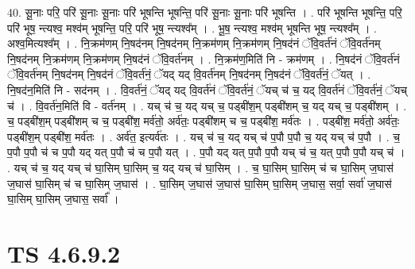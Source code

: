 \documentclass[17pt]{extarticle}
\begin{document}
40. सू॒नाः परि॒ परि॑ सू॒नाः सू॒नाः परि॑ भूषन्ति भूषन्ति॒ परि॑ सू॒नाः सू॒नाः परि॑ भूषन्ति । . परि॑ भूषन्ति भूषन्ति॒ परि॒ परि॑ भूष॒ न्त्यश्व॒ मश्व॑म् भूषन्ति॒ परि॒ परि॑ भूष॒ न्त्यश्व᳚म् । . भू॒ष॒ न्त्यश्व॒ मश्व॑म् भूषन्ति भूष॒ न्त्यश्व᳚म् । . अश्व॒मित्यश्व᳚म् । . नि॒क्रम॑णम् नि॒षद॑नम् नि॒षद॑नम् नि॒क्रम॑णम् नि॒क्रम॑णम् नि॒षद॑नं ॅवि॒वर्त॑नं ॅवि॒वर्त॑नम् नि॒षद॑नम् नि॒क्रम॑णम् नि॒क्रम॑णम् नि॒षद॑नं ॅवि॒वर्त॑नम् । . नि॒क्रम॑ण॒मिति॑ नि - क्रम॑णम् । . नि॒षद॑नं ॅवि॒वर्त॑नं ॅवि॒वर्त॑नम् नि॒षद॑नम् नि॒षद॑नं ॅवि॒वर्त॑नं॒ ॅयद् यद् वि॒वर्त॑नम् नि॒षद॑नम् नि॒षद॑नं ॅवि॒वर्त॑नं॒ ॅयत् । . नि॒षद॑न॒मिति॑ नि - सद॑नम् । . वि॒वर्त॑नं॒ ॅयद् यद् वि॒वर्त॑नं ॅवि॒वर्त॑नं॒ ॅयच् च॑ च॒ यद् वि॒वर्त॑नं ॅवि॒वर्त॑नं॒ ॅयच् च॑ । . वि॒वर्त॑न॒मिति॑ वि - वर्त॑नम् । . यच् च॑ च॒ यद् यच् च॒ पड्बी॑श॒म् पड्बी॑शम् च॒ यद् यच् च॒ पड्बी॑शम् । . च॒ पड्बी॑श॒म् पड्बी॑शम् च च॒ पड्बी॑श॒ मर्व॑तो॒ अर्व॑तः॒ पड्बी॑शम् च च॒ पड्बी॑श॒ मर्व॑तः । . पड्बी॑श॒ मर्व॑तो॒ अर्व॑तः॒ पड्बी॑श॒म् पड्बी॑श॒ मर्व॑तः । . अर्व॑त॒ इत्यर्व॑तः । . यच् च॑ च॒ यद् यच् च॑ प॒पौ प॒पौ च॒ यद् यच् च॑ प॒पौ । . च॒ प॒पौ प॒पौ च॑ च प॒पौ यद् यत् प॒पौ च॑ च प॒पौ यत् । . प॒पौ यद् यत् प॒पौ प॒पौ यच् च॑ च॒ यत् प॒पौ प॒पौ यच् च॑ । . यच् च॑ च॒ यद् यच् च॑ घा॒सिम् घा॒सिम् च॒ यद् यच् च॑ घा॒सिम् । . च॒ घा॒सिम् घा॒सिम् च॑ च घा॒सिम् ज॒घास॑ ज॒घास॑ घा॒सिम् च॑ च घा॒सिम् ज॒घास॑ । . घा॒सिम् ज॒घास॑ ज॒घास॑ घा॒सिम् घा॒सिम् ज॒घास॒ सर्वा॒ सर्वा॑ ज॒घास॑ घा॒सिम् घा॒सिम् ज॒घास॒ सर्वा᳚ । \newline
\pagebreak
{}

\section{ TS 4.6.9.2 }
\end{document}
